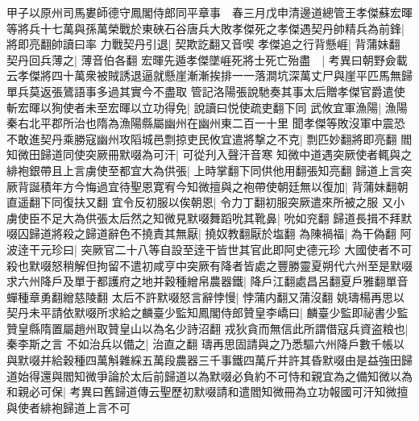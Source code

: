 甲子以原州司馬婁師德守鳳閣侍郎同平章事　春三月戊申清邊道總管王孝傑蘇宏暉等將兵十七萬與孫萬榮戰於東硤石谷唐兵大敗孝傑死之孝傑遇契丹帥精兵為前鋒|{
	將即亮翻帥讀曰率}
力戰契丹引退|{
	契欺訖翻又音喫}
孝傑追之行背懸崕|{
	背蒲妹翻}
契丹回兵薄之|{
	薄音伯各翻}
宏暉先遁孝傑墜崕死將士死亡殆盡　|{
	考異曰朝野僉載云孝傑將四十萬衆被賊誘退逼就懸崖漸漸挨排一一落澗坑深萬丈尸與崖平匹馬無歸單兵莫返張鷟語事多過其實今不盡取}
管記洛陽張說馳奏其事太后贈孝傑官爵遣使斬宏暉以狥使者未至宏暉以立功得免|{
	說讀曰悦使疏吏翻下同}
武攸宜軍漁陽|{
	漁陽秦右北平郡所治也隋為漁陽縣屬幽州在幽州東二百一十里}
聞孝傑等敗沒軍中震恐不敢進契丹乘勝寇幽州攻䧟城邑剽掠吏民攸宜遣將撃之不克|{
	剽匹妙翻將即亮翻}
閻知微田歸道同使突厥冊默啜為可汗|{
	可從刋入聲汗音寒}
知微中道遇突厥使者輒與之緋袍銀帶且上言虜使至都宜大為供張|{
	上時掌翻下同供他用翻張知亮翻}
歸道上言突厥背誕積年方今悔過宜待聖恩寛宥今知微擅與之袍帶使朝廷無以復加|{
	背蒲妹翻朝直遥翻下同復扶又翻}
宜令反初服以俟朝恩|{
	令力丁翻初服突厥遣來所被之服}
又小虜使臣不足大為供張太后然之知微見默啜舞蹈吮其靴鼻|{
	吮如兖翻}
歸道長揖不拜默啜囚歸道將殺之歸道辭色不撓責其無厭|{
	撓奴教翻厭於塩翻}
為陳禍福|{
	為干偽翻}
阿波逹干元珍曰|{
	突厥官二十八等自設至逹干皆世其官此即阿史德元珍}
大國使者不可殺也默啜怒稍解但拘留不遣初咸亨中突厥有降者皆處之豐勝靈夏朔代六州至是默啜求六州降戶及單于都護府之地并穀種繒帛農器鐵|{
	降戶江翻處昌呂翻夏戶雅翻單音蟬種章勇翻繒慈陵翻}
太后不許默啜怒言辭悖慢|{
	悖蒲内翻又蒲沒翻}
姚璹楊再思以契丹未平請依默啜所求給之麟臺少監知鳳閣侍郎贊皇李嶠曰|{
	麟臺少監即祕書少監贊皇縣隋置屬趙州取贊皇山以為名少詩沼翻}
戎狄貪而無信此所謂借寇兵資盗粮也|{
	秦李斯之言}
不如治兵以備之|{
	治直之翻}
璹再思固請與之乃悉驅六州降戶數千帳以與默啜并給穀種四萬斛雜綵五萬段農器三千事鐵四萬斤并許其昏默啜由是益強田歸道始得還與閻知微爭論於太后前歸道以為默啜必負約不可恃和親宜為之備知微以為和親必可保|{
	考異曰舊歸道傳云聖歷初默啜請和遣閻知微冊為立功報國可汗知微擅與使者緋袍歸道上言不可}


